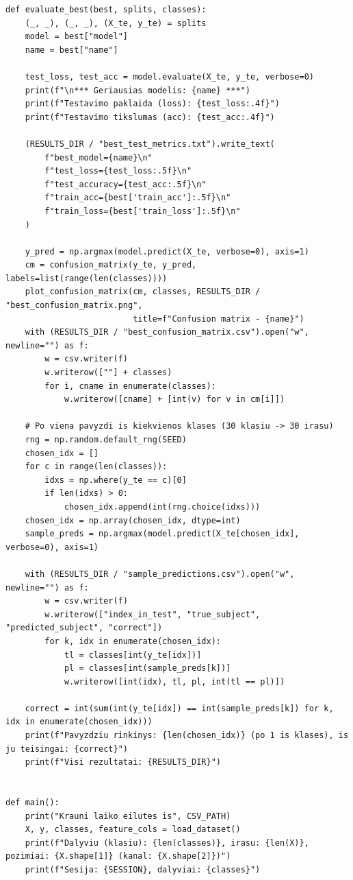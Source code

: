 \documentclass[]{VUMIFTemplateClass}
\begin{document}
\begin{verbatim}
def evaluate_best(best, splits, classes):
    (_, _), (_, _), (X_te, y_te) = splits
    model = best["model"]
    name = best["name"]

    test_loss, test_acc = model.evaluate(X_te, y_te, verbose=0)
    print(f"\n*** Geriausias modelis: {name} ***")
    print(f"Testavimo paklaida (loss): {test_loss:.4f}")
    print(f"Testavimo tikslumas (acc): {test_acc:.4f}")

    (RESULTS_DIR / "best_test_metrics.txt").write_text(
        f"best_model={name}\n"
        f"test_loss={test_loss:.5f}\n"
        f"test_accuracy={test_acc:.5f}\n"
        f"train_acc={best['train_acc']:.5f}\n"
        f"train_loss={best['train_loss']:.5f}\n"
    )

    y_pred = np.argmax(model.predict(X_te, verbose=0), axis=1)
    cm = confusion_matrix(y_te, y_pred, labels=list(range(len(classes))))
    plot_confusion_matrix(cm, classes, RESULTS_DIR / "best_confusion_matrix.png",
                          title=f"Confusion matrix - {name}")
    with (RESULTS_DIR / "best_confusion_matrix.csv").open("w", newline="") as f:
        w = csv.writer(f)
        w.writerow([""] + classes)
        for i, cname in enumerate(classes):
            w.writerow([cname] + [int(v) for v in cm[i]])

    # Po viena pavyzdi is kiekvienos klases (30 klasiu -> 30 irasu)
    rng = np.random.default_rng(SEED)
    chosen_idx = []
    for c in range(len(classes)):
        idxs = np.where(y_te == c)[0]
        if len(idxs) > 0:
            chosen_idx.append(int(rng.choice(idxs)))
    chosen_idx = np.array(chosen_idx, dtype=int)
    sample_preds = np.argmax(model.predict(X_te[chosen_idx], verbose=0), axis=1)

    with (RESULTS_DIR / "sample_predictions.csv").open("w", newline="") as f:
        w = csv.writer(f)
        w.writerow(["index_in_test", "true_subject", "predicted_subject", "correct"])
        for k, idx in enumerate(chosen_idx):
            tl = classes[int(y_te[idx])]
            pl = classes[int(sample_preds[k])]
            w.writerow([int(idx), tl, pl, int(tl == pl)])

    correct = int(sum(int(y_te[idx]) == int(sample_preds[k]) for k, idx in enumerate(chosen_idx)))
    print(f"Pavyzdziu rinkinys: {len(chosen_idx)} (po 1 is klases), is ju teisingai: {correct}")
    print(f"Visi rezultatai: {RESULTS_DIR}")


def main():
    print("Krauni laiko eilutes is", CSV_PATH)
    X, y, classes, feature_cols = load_dataset()
    print(f"Dalyviu (klasiu): {len(classes)}, irasu: {len(X)}, pozimiai: {X.shape[1]} (kanal: {X.shape[2]})")
    print(f"Sesija: {SESSION}, dalyviai: {classes}")


\end{verbatim}
\end{document}
